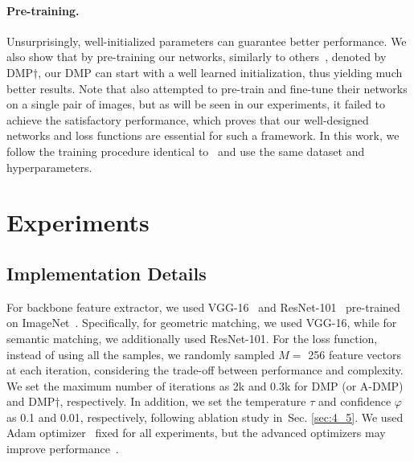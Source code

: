 \documentclass[10pt,twocolumn,letterpaper]{article}
\newcommand{\secref}[1]{Sec. \ref{#1}}
\begin{document}
\paragraph{Pre-training.}
Unsurprisingly, well-initialized parameters can guarantee better performance. We also show that by pre-training our networks, similarly to others~\cite{truong2020glu,truong2020gocor}, denoted by DMP$\dagger$, our DMP can start with a well learned initialization, thus yielding much better results. Note that \cite{shen2020ransac} also attempted to pre-train and fine-tune their networks on a single pair of images, but as will be seen in our experiments, it failed to achieve the satisfactory performance, which proves that our well-designed networks and loss functions are essential for such a framework. 
In this work, we follow the training procedure identical to~\cite{truong2020glu} and use the same dataset and hyperparameters.

\section{Experiments}
\subsection{Implementation Details}\label{sec:4_1}
For backbone feature extractor, we used VGG-16~\cite{simonyan2014very} and ResNet-101~\cite{he2016deep} pre-trained on ImageNet~\cite{deng2009imagenet}. Specifically, for geometric matching, we used VGG-16, while for semantic matching, we additionally used ResNet-101. 
For the loss function, instead of using all the samples, we randomly sampled $M=$ 256 feature vectors at each iteration, considering the trade-off between performance and complexity. We set the maximum number of iterations as 2k and 0.3k for DMP (or A-DMP) and DMP$\dagger$, respectively. In addition, we set the temperature $\tau$ and confidence $\varphi$ as 0.1 and 0.01, respectively, following ablation study in~\secref{sec:4_5}. We used Adam optimizer~\cite{kingma2014adam} fixed for all experiments, but the advanced optimizers may improve performance~\cite{reddi2019convergence,liu2019variance}. 
\end{document}
